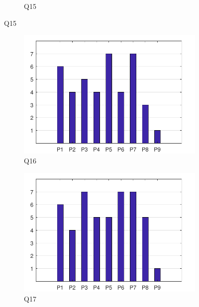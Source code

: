\documentclass[english, 12pt, a4paper, pdftex, elec, utf8]{aaltothesis}
\begin{document}
\begin{figure}[h!]
\begin{subfigure}[b]{0.49\textwidth}
        \caption*{Q15}
    \end{subfigure}
\end{figure}

\begin{figure}[h!]
    \centering
    \begin{subfigure}[b]{0.49\textwidth}
        \includegraphics[width=\textwidth]{T2_7.pdf}
        \caption*{Q16}
    \end{subfigure}
    \begin{subfigure}[b]{0.49\textwidth}
        \includegraphics[width=\textwidth]{T2_8.pdf}
        \caption*{Q17}
    \end{subfigure}
    \begin{subfigure}[b]{0.49\textwidth}

\end{subfigure}
\end{figure}
\end{document}
